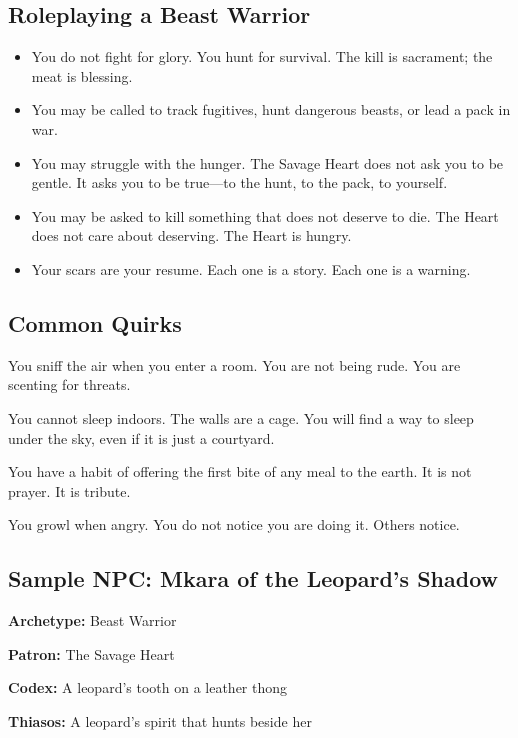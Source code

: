 \subsection{Roleplaying a Beast Warrior}

\begin{itemize}
\item You do not fight for glory. You hunt for survival. The kill is sacrament; the meat is blessing.
\item You may be called to track fugitives, hunt dangerous beasts, or lead a pack in war.
\item You may struggle with the hunger. The Savage Heart does not ask you to be gentle. It asks you to be true—to the hunt, to the pack, to yourself.
\item You may be asked to kill something that does not deserve to die. The Heart does not care about deserving. The Heart is hungry.
\item Your scars are your resume. Each one is a story. Each one is a warning.
\end{itemize}

\subsection{Common Quirks}

\begin{dice}
\item You sniff the air when you enter a room. You are not being rude. You are scenting for threats.
\item You cannot sleep indoors. The walls are a cage. You will find a way to sleep under the sky, even if it is just a courtyard.
\item You have a habit of offering the first bite of any meal to the earth. It is not prayer. It is tribute.
\item You growl when angry. You do not notice you are doing it. Others notice.
\end{dice}

\subsection{Sample NPC: Mkara of the Leopard's Shadow}

\textbf{Archetype:} Beast Warrior

\textbf{Patron:} The Savage Heart

\textbf{Codex:} A leopard's tooth on a leather thong

\textbf{Thiasos:} A leopard's spirit that hunts beside her

